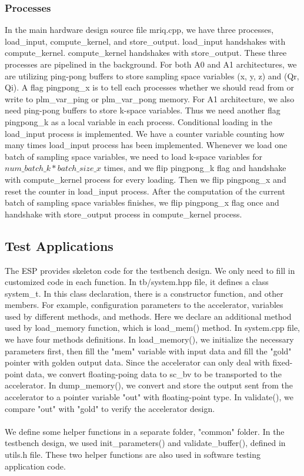 \subsubsection{Processes}

In the main hardware design source file mriq.cpp, we have three processes,
load\_input, compute\_kernel, and store\_output. load\_input handshakes with
compute\_kernel. compute\_kernel handshakes with store\_output. These three
processes are pipelined in the background. For both A0 and A1 architectures, we
are utilizing ping-pong buffers to store sampling space variables (x, y, z) and
(Qr, Qi). A flag pingpong\_x is to tell each processes whether we should read
from or write to plm\_var\_ping or plm\_var\_pong memory. For A1 architecture,
we also need ping-pong buffers to store k-space variables. Thus we need another
flag pingpong\_k as a local variable in each process. Conditional loading in the
load\_input process is implemented. We have a counter variable counting how many
times load\_input process has been implemented. Whenever we load one batch of
sampling space variables, we need to load k-space variables for $num\_batch\_k *
batch\_size\_x$ times, and we flip pingpong\_k flag and handshake with
compute\_kernel process for every loading. Then we flip pingpong\_x and reset
the counter in load\_input process. After the computation of the current batch
of sampling space variables finishes, we flip pingpong\_x flag once and
handshake with store\_output process in compute\_kernel process. \\

\subsection{Test Applications}

The ESP provides skeleton code for the testbench design. We only need to fill in
customized code in each function. In tb/system.hpp file, it defines a class
system\_t. In this class declaration, there is a constructor function, and other
members. For example, configuration parameters to the accelerator, variables
used by different methods, and methods. Here we declare an additional method
used by load\_memory function, which is load\_mem() method. In system.cpp file,
we have four methods definitions. In load\_memory(), we initialize the necessary
parameters first, then fill the "mem" variable with input data and fill the
"gold" pointer with golden output data. Since the accelerator can only deal with
fixed-point data, we convert floating-poing data to sc\_bv to be transported to
the accelerator. In dump\_memory(), we convert and store the output sent from
the accelerator to a pointer variable "out" with floating-point type. In
validate(), we compare "out" with "gold" to verify the accelerator
design. \\ \\ We define some helper functions in a separate folder, "common"
folder. In the testbench design, we used init\_parameters() and
validate\_buffer(), defined in utils.h file. These two helper functions are also
used in software testing application code.\\

